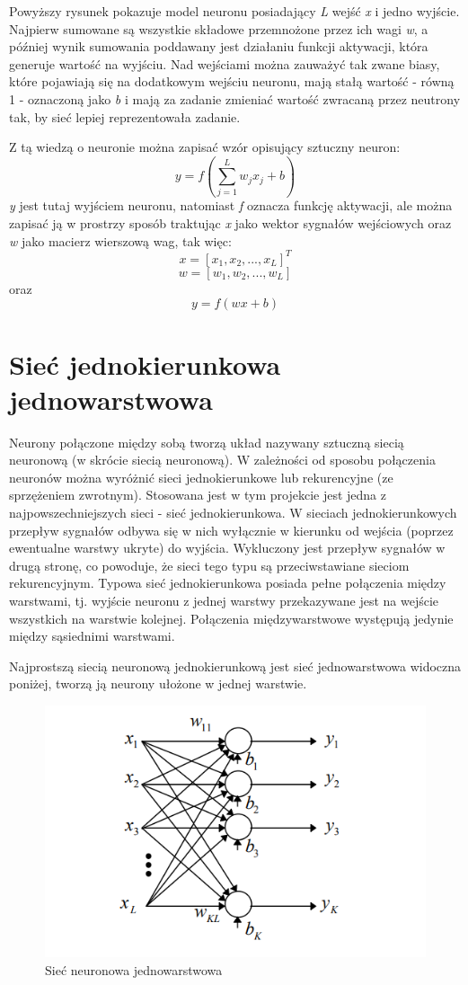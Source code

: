 \documentclass[a4paper, 12pt]{report}
\begin{document}
Powyższy rysunek pokazuje model neuronu posiadający \textit{L} wejść \textit{x} i jedno wyjście. Najpierw sumowane są wszystkie składowe przemnożone przez ich wagi \textit{w}, a później wynik sumowania poddawany jest działaniu funkcji aktywacji, która generuje wartość na wyjściu. Nad wejściami można zauważyć tak zwane biasy, które pojawiają się na dodatkowym wejściu neuronu, mają stałą wartość - równą 1 - oznaczoną jako \textit{b} i mają za zadanie zmieniać wartość zwracaną przez neutrony tak, by sieć lepiej reprezentowała zadanie.\\
\newpage

Z tą wiedzą o neuronie można zapisać wzór opisujący sztuczny neuron:
\[
y = f \left( {\sum_{j=1}^{L}  w_j x_j + b } \right)
\]
\textit{y} jest tutaj wyjściem neuronu, natomiast \textit{f} oznacza funkcję aktywacji, ale można zapisać ją w prostrzy sposób traktując \textit{x} jako wektor sygnałów wejściowych oraz \textit{w} jako macierz wierszową wag\cite {book3},  tak więc:
\[ x = [x_1, x_2, ..., x_L]^T \]
\[ w = [w_1, w_2, ..., w_L] \]
oraz
\[ y = f \left( {wx + b } \right) \]

\section{Sieć jednokierunkowa jednowarstwowa}
Neurony połączone między sobą tworzą układ nazywany sztuczną siecią neuronową (w skrócie siecią neuronową). W zależności od sposobu połączenia neuronów można wyróżnić sieci jednokierunkowe lub rekurencyjne (ze sprzężeniem zwrotnym). Stosowana jest w tym projekcie jest jedna z najpowszechniejszych sieci - sieć jednokierunkowa.
 W sieciach jednokierunkowych przepływ sygnałów odbywa się w nich wyłącznie w kierunku od wejścia (poprzez ewentualne warstwy ukryte) do wyjścia. Wykluczony jest przepływ sygnałów w drugą stronę, co powoduje, że sieci tego typu są przeciwstawiane sieciom rekurencyjnym. Typowa sieć jednokierunkowa posiada pełne połączenia między warstwami, tj. wyjście neuronu z jednej warstwy przekazywane jest na wejście wszystkich na warstwie kolejnej. Połączenia międzywarstwowe występują jedynie między sąsiednimi warstwami.

 Najprostszą siecią neuronową jednokierunkową jest sieć jednowarstwowa widoczna poniżej, tworzą ją neurony ułożone w jednej warstwie. 
\begin{figure}[hbt!]
\includegraphics[width=12cm]{jednowarstwowa}
\centering
\caption{Sieć neuronowa jednowarstwowa\cite {book4}}
\end{figure}
\end{document}
